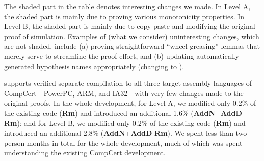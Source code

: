 The shaded part in the table denotes interesting changes we made.  In
Level A, the shaded part is mainly due to proving various monotonicity
properties. In Level B, the shaded part is mainly due to
copy-paste-and-modifying the original proof of simulation.  Examples of
(what we consider) uninteresting changes, which are not shaded,
include (a) proving straightforward ``wheel-greasing'' lemmas that
merely serve to streamline the proof effort, and (b) updating
automatically generated hypothesis names appropriately (\eg changing
 to ).

\sepcomp{} supports verified separate compilation to all three target
assembly languages of CompCert---PowerPC, ARM, and IA32---with very
few changes made to the original proofs. In the whole development, for
Level A, we modified only 0.2\% of the existing code (\textbf{Rm}) and
introduced an additional 1.6\%
(\textbf{AddN}+\textbf{AddD}-\textbf{Rm}); and for Level B, we
modified only 0.2\% of the existing code (\textbf{Rm}) and introduced
an additional 2.8\% (\textbf{AddN}+\textbf{AddD}-\textbf{Rm}).  We
spent less than two person-months in total for the whole development,
much of which was spent understanding the existing CompCert
development.



